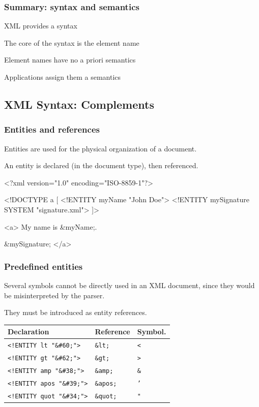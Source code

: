 \begin{frame}
\frametitle{Summary: syntax and semantics}

XML provides a syntax

\vfill
The core of the syntax is the \alert{element name}

\vfill
Element names have no a priori semantics

\vfill
Applications assign them a semantics




\end{frame}

\subsection{XML Syntax: Complements}



\begin{frame}[fragile]
\frametitle{Entities and references}

Entities are used for the physical organization of a document.

\vfill

An entity is \alert{declared} (in the document type), then
\alert{referenced}.
 
\begin{tinyverbatim}
<?xml version="1.0" encoding="ISO-8859-1"?>

<!DOCTYPE a [
  <!ENTITY  myName "John Doe">
  <!ENTITY  mySignature SYSTEM "signature.xml">
]>

<a>
  My name is &myName;.

  &mySignature;
</a>
\end{tinyverbatim}

\end{frame}

\begin{frame}
\frametitle{Predefined entities}

Several symbols cannot be directly used in an XML
document, since they would be misinterpreted by the parser.

\vfill

They must be introduced as entity references.

\vfill
 
\begin{tabular}{l|l|l}
{\bf Declaration} & {\bf Reference}&{\bf Symbol.}\\ 
\hline 
\texttt{<!ENTITY lt   "\&\#60;">}&\texttt{\&lt;}&\texttt{<}\\ 
\texttt{<!ENTITY gt   "\&\#62;">}&\texttt{\&gt;}&\texttt{>}\\ 
\texttt{<!ENTITY amp  "\&\#38;">}&\texttt{\&amp;}&\texttt{\&}\\ 
\texttt{<!ENTITY apos "\&\#39;">}&\texttt{\&apos;}&\texttt{'}\\ 
\texttt{<!ENTITY quot "\&\#34;">}&\texttt{\&quot;}&\texttt{"} \\ \hline
\end{tabular}

\end{frame}

